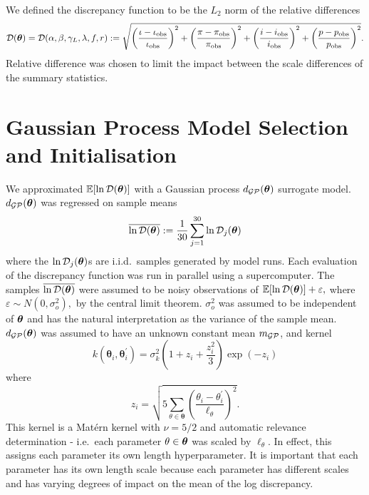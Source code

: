 We defined the discrepancy function to be the $L_2$ norm of the relative
differences
$$
    \mathcal{D}(\bm{\theta}) = \mathcal{D}(\alpha, \beta, \gamma_L, \lambda, f, r)
    := \sqrt{
        \left(\frac{\iota - \iota_\text{obs}}{\iota_\text{obs}}\right)^2
        + \left(\frac{\pi - \pi_\text{obs}}{\pi_\text{obs}}\right)^2
        + \left(\frac{i - i_\text{obs}}{i_\text{obs}}\right)^2
        + \left(\frac{p - p_\text{obs}}{p_\text{obs}}\right)^2
    }.
$$
Relative difference was chosen to limit the impact between the scale
differences of the summary statistics.

\section{Gaussian Process Model Selection and Initialisation}

We approximated $\operatorname{\mathbb{E}}[\ln\mathcal{D}(\bm{\theta})]$ with
a Gaussian process $d_{\mathcal{GP}}(\bm{\theta})$ surrogate model.
$d_{\mathcal{GP}}(\bm{\theta})$ was regressed on sample means
$$
    \overline{\ln\mathcal{D}(\bm{\theta})} := \frac{1}{30}\sum_{j = 1}^{30} \ln\mathcal{D}_j(\bm{\theta})
$$
where the $\ln\mathcal{D}_j(\bm{\theta})$s are i.i.d.\ samples generated by model runs.
Each evaluation of the discrepancy function was run in parallel
using a supercomputer.
The samples
$\overline{\ln\mathcal{D}(\bm{\theta})}$ were assumed to be noisy observations of
$\operatorname{\mathbb{E}}[\ln\mathcal{D}(\bm{\theta})] + \varepsilon,$ where
$\varepsilon \sim N(0, \sigma_o^2),$ by the central limit theorem.
$\sigma_o^2$ was assumed to be independent of $\bm{\theta}$ and has the natural
interpretation as the variance of the sample mean.
$d_{\mathcal{GP}}(\bm{\theta})$ was assumed to have an unknown constant mean $m_{\mathcal{GP}}$, and kernel
$$
    k(\bm{\theta}_i, \bm{\theta}_i^\prime)
    = \sigma_k^2 (1 + z_i + \frac{z_i^2}{3})\exp(-z_i)
$$
where
$$
    z_i = \sqrt{
        5 \sum_{\theta\in \bm{\theta}}\left(
        \frac{\theta_i - \theta_i^\prime}{\ell_\theta}
        \right)^2
    }.
$$
This kernel is a Mat\'ern kernel with $\nu = 5/2$ and automatic
relevance determination - i.e.\ each parameter $\theta\in\bm{\theta}$ was
scaled by $\ell_\theta.$ In effect, this assigns each parameter its own
length hyperparameter. It is important that each parameter has its own length
scale because each parameter has different scales and has varying degrees of
impact on the mean of the log discrepancy.

